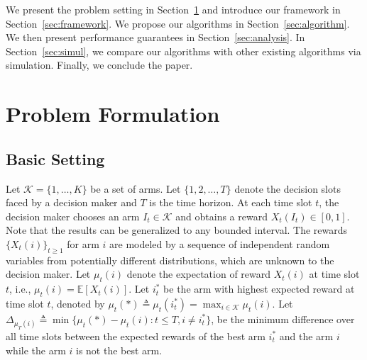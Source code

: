 \documentclass[letterpaper]{article} %
\begin{document}
We present the problem setting in Section~\ref{sec:problemform} and introduce our framework in Section~\ref{sec:framework}. We propose our algorithms in Section~\ref{sec:algorithm}. We then present performance guarantees in Section~\ref{sec:analysis}. In Section~\ref{sec:simul}, we compare our algorithms with other existing algorithms via simulation. Finally, we conclude the paper. %
\section{Problem Formulation}\label{sec:problemform}
\subsection{Basic Setting}
Let $\mathcal{K}=\{1,\ldots,K\}$ be a set of arms. Let $\{1,2,\ldots,T\}$ denote the decision slots faced by a decision maker and $T$ is the time horizon. At each time slot $t$, the decision maker chooses an arm $I_t\in\mathcal{K}$ and obtains a reward $X_t(I_t)\in[0,1]$. Note that the results can be generalized to any bounded interval. The rewards $\{X_t(i)\}_{t\geq1}$ for arm $i$ are modeled by a sequence of independent random variables from potentially different distributions, which are unknown to the decision maker. 
Let $\mu_t(i)$ denote the expectation of reward $X_t(i)$ at time slot $t$, i.e., $\mu_t(i)=\mathbb{E}[X_t(i)]$. Let $i^*_t$ be the arm with highest expected reward at time slot $t$, denoted by $\mu_t(*)\triangleq\mu_t(i^*_t)=\max_{i\in\mathcal{K}}\mu_t(i)$.
Let $\Delta_{\mu_T(i)}\triangleq\min\{\mu_t(*)-\mu_t(i):t\leq T, i\neq i^*_t\}$, be the minimum difference over all time slots between the expected rewards of the best arm $i^*_t$ and the arm $i$ while the arm $i$ is not the best arm. %
\end{document}

